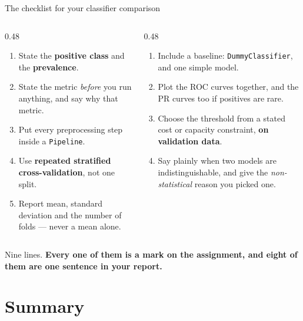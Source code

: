 \documentclass[aspectratio=169]{beamer}
\begin{document}
\begin{frame}[shrink=6]{The checklist for your classifier comparison}
  \begin{columns}[T]
    \begin{column}{0.48\textwidth}
      \begin{enumerate}\small
        \item State the \textbf{positive class} and the \textbf{prevalence}.
        \item State the metric \emph{before} you run anything, and say why
          that metric.
        \item Put every preprocessing step inside a \texttt{Pipeline}.
        \item Use \textbf{repeated stratified cross-validation}, not one
          split.
        \item Report mean, standard deviation and the number of folds ---
          never a mean alone.
      \end{enumerate}
    \end{column}
    \begin{column}{0.48\textwidth}
      \begin{enumerate}\small
        \setcounter{enumi}{5}
        \item Include a baseline: \texttt{DummyClassifier}, and one simple
          model.
        \item Plot the ROC curves together, and the PR curves too if positives
          are rare.
        \item Choose the threshold from a stated cost or capacity constraint,
          \textbf{on validation data}.
        \item Say plainly when two models are indistinguishable, and give the
          \emph{non-statistical} reason you picked one.
      \end{enumerate}
    \end{column}
  \end{columns}
  \vspace{0.2em}
  \begin{alertblock}{}
    \centering\small
    Nine lines. \textbf{Every one of them is a mark on the assignment, and
    eight of them are one sentence in your report.}
  \end{alertblock}
\end{frame}

\section{Summary}
\label{sec:summary}
\end{document}
